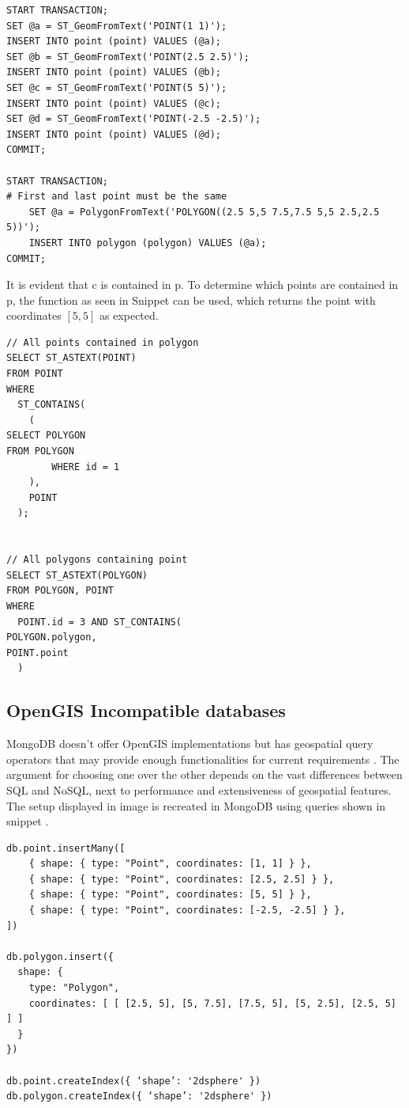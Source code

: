 \begin{Verbatim}[fontsize=\scriptsize]
START TRANSACTION;
SET @a = ST_GeomFromText('POINT(1 1)');
INSERT INTO point (point) VALUES (@a);
SET @b = ST_GeomFromText('POINT(2.5 2.5)');
INSERT INTO point (point) VALUES (@b);
SET @c = ST_GeomFromText('POINT(5 5)');
INSERT INTO point (point) VALUES (@c);
SET @d = ST_GeomFromText('POINT(-2.5 -2.5)');
INSERT INTO point (point) VALUES (@d);
COMMIT;

START TRANSACTION;
# First and last point must be the same
	SET @a = PolygonFromText('POLYGON((2.5 5,5 7.5,7.5 5,5 2.5,2.5 5))');
	INSERT INTO polygon (polygon) VALUES (@a);
COMMIT;
\end{Verbatim}

It is evident that c is contained in p. To determine which points are contained in p, the function as seen in Snippet  can be used, which returns the point with coordinates $[5, 5]$ as expected.

\begin{Verbatim}[fontsize=\scriptsize]
// All points contained in polygon
SELECT ST_ASTEXT(POINT)
FROM POINT
WHERE
  ST_CONTAINS(
    (
SELECT POLYGON
FROM POLYGON
        WHERE id = 1
    ),
    POINT
  );


// All polygons containing point
SELECT ST_ASTEXT(POLYGON)
FROM POLYGON, POINT
WHERE
  POINT.id = 3 AND ST_CONTAINS(
POLYGON.polygon,
POINT.point
  )
\end{Verbatim}


\subsection{OpenGIS Incompatible databases}

MongoDB doesn’t offer OpenGIS implementations but has geospatial query operators that may provide enough functionalities for current requirements . The argument for choosing one over the other depends on the vast differences between SQL and NoSQL, next to performance and extensiveness of geospatial features. The setup displayed in image  is recreated in MongoDB using queries shown in snippet .

\begin{Verbatim}[fontsize=\scriptsize]
db.point.insertMany([
	{ shape: { type: "Point", coordinates: [1, 1] } },
	{ shape: { type: "Point", coordinates: [2.5, 2.5] } },
	{ shape: { type: "Point", coordinates: [5, 5] } },
	{ shape: { type: "Point", coordinates: [-2.5, -2.5] } },
])

db.polygon.insert({
  shape: {
    type: "Polygon",
    coordinates: [ [ [2.5, 5], [5, 7.5], [7.5, 5], [5, 2.5], [2.5, 5] ] ]
  }
})

db.point.createIndex({ ‘shape’: '2dsphere' })
db.polygon.createIndex({ ‘shape’: '2dsphere' })
\end{Verbatim}

